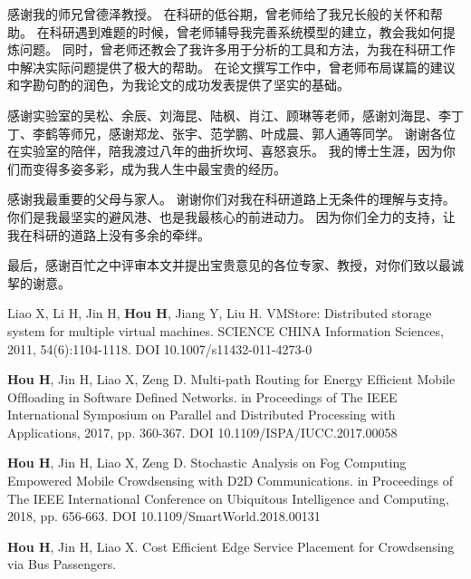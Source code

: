 \documentclass[format=draft,language=chinese,degree=phd,table,usenames,dvipsnames]{hustthesis}
\begin{document}
\begin{ack}
感谢我的师兄曾德泽教授。
在科研的低谷期，曾老师给了我兄长般的关怀和帮助。
在科研遇到难题的时候，曾老师辅导我完善系统模型的建立，教会我如何提炼问题。
同时，曾老师还教会了我许多用于分析的工具和方法，为我在科研工作中解决实际问题提供了极大的帮助。
在论文撰写工作中，曾老师布局谋篇的建议和字勘句酌的润色，为我论文的成功发表提供了坚实的基础。


感谢实验室的吴松、余辰、刘海昆、陆枫、肖江、顾琳等老师，感谢刘海昆、李丁丁、李鹤等师兄，感谢郑龙、张宇、范学鹏、叶成晨、郭人通等同学。
谢谢各位在实验室的陪伴，陪我渡过八年的曲折坎坷、喜怒哀乐。
我的博士生涯，因为你们而变得多姿多彩，成为我人生中最宝贵的经历。

感谢我最重要的父母与家人。
谢谢你们对我在科研道路上无条件的理解与支持。
你们是我最坚实的避风港、也是我最核心的前进动力。
因为你们全力的支持，让我在科研的道路上没有多余的牵绊。

最后，感谢百忙之中评审本文并提出宝贵意见的各位专家、教授，对你们致以最诚挈的谢意。


\end{ack}



\appendix


\begin{publications}
\item Liao X, Li H, Jin H, \textbf{Hou H}, Jiang Y, Liu H. VMStore: Distributed storage system for multiple virtual machines. SCIENCE CHINA Information Sciences, 2011, 54(6):1104-1118. DOI 10.1007/s11432-011-4273-0
\item \textbf{Hou H}, Jin H, Liao X, Zeng D. Multi-path Routing for Energy Efﬁcient Mobile Ofﬂoading in Software Deﬁned Networks. in Proceedings of The IEEE International Symposium on Parallel and Distributed Processing with Applications, 2017, pp. 360-367. DOI 10.1109/ISPA/IUCC.2017.00058
\item \textbf{Hou H}, Jin H, Liao X, Zeng D. Stochastic Analysis on Fog Computing Empowered Mobile Crowdsensing with D2D Communications. in Proceedings of The IEEE International Conference on Ubiquitous Intelligence and Computing, 2018, pp. 656-663. DOI 10.1109/SmartWorld.2018.00131
\item \textbf{Hou H}, Jin H, Liao X. Cost Efficient Edge Service Placement for Crowdsensing via Bus Passengers.
\end{publications}
\end{document}
